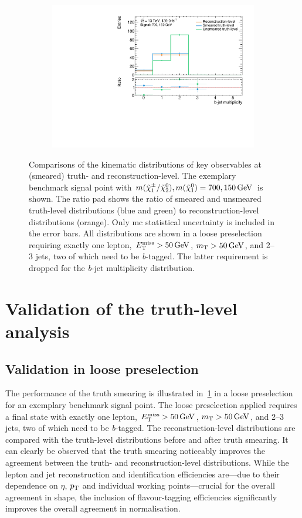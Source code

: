 \begin{figure}
\begin{subfigure}[b]{0.45\linewidth}
		\centering\includegraphics[width=\textwidth]{20210324/700_150/nBJet30_C1N2_Wh_hbb_700p0_150p0_smeared.pdf}
	\end{subfigure}\hfill
	\caption{Comparisons of the kinematic distributions of key observables at (smeared) truth- and reconstruction-level. The exemplary benchmark signal point with $m(\charg/\neutr), m(\lsp) = 700, \SI{150}{\GeV}$ is shown. The ratio pad shows the ratio of smeared and unsmeared truth-level distributions (blue and green) to reconstruction-level distributions (orange). Only \gls{mc} statistical uncertainty is included in the error bars. All distributions are shown in a loose preselection requiring exactly one lepton, $\met>\SI{50}{\GeV}$, $\mt > \SI{50}{\GeV}$, and 2--3 jets, two of which need to be \textit{b}-tagged. The latter requirement is dropped for the \textit{b}-jet multiplicity distribution.}
	\label{fig:smearing_preselection}
\end{figure}
 
\section{Validation of the truth-level analysis}

\subsection{Validation in loose preselection}

 The performance of the truth smearing is illustrated in~\cref{fig:smearing_preselection} in a loose preselection for an exemplary benchmark signal point. The loose preselection applied requires a final state with exactly one lepton, $\met>\SI{50}{\GeV}$, $\mt > \SI{50}{\GeV}$, and 2--3 jets, two of which need to be \textit{b}-tagged. The reconstruction-level distributions are compared with the truth-level distributions before and after truth smearing. It can clearly be observed that the truth smearing noticeably improves the agreement between the truth- and reconstruction-level distributions. While the lepton and jet reconstruction and identification efficiencies are---due to their dependence on $\eta$, $p_{\textrm{T}}$ and individual working points---crucial for the overall agreement in shape, the inclusion of flavour-tagging efficiencies significantly improves the overall agreement in normalisation.
 
